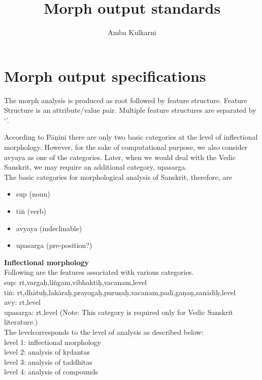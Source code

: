 \documentclass{llncs}
\begin{document}
\title{Morph output standards}
\author{Amba Kulkarni}
\date{}

\frenchspacing
\noindent
\maketitle

\section{Morph output specifications}
The morph analysis is produced as root followed by feature structure.
Feature Structure is an attribute/value pair. Multiple feature structures are separated by `\textbar'.

According to P{\=a}\d{n}ini there are only two basic categories at the level of inflectional morphology. However, for the sake of computational purpose, we also consider avyaya as one of the categories. Later, when we would deal with the Vedic Sanskrit, we may require an additional category, upasarga.\\

\noindent 
The basic categories for morphological analysis of Sanskrit, therefore, are 

\begin{itemize}
\item sup (noun)
\item ti\.{n} (verb)
\item avyaya (indeclinable)
\item upasarga (pre-position?)
\end{itemize}

\noindent 
\textbf {Inflectional morphology}\\
Following are the features associated with various categories.\\
sup:  rt,varga\d{h},li\.{n}gam,vibhakti\d{h},vacanam,level \\
ti\.{n}:  rt,dh{\=a}tu\d{h},lak{\=a}ra\d{h},prayoga\d{h},puru\d{s}a\d{h},vacanam,pad{\=\i},ga\d{n}a\d{n},san{\=a}di\d{h},level \\
avy:  rt,level \\
upasarga:  rt,level (Note: This category is required only for Vedic Sanskrit literature.)\\

The levelcorresponds to the level of analysis as described below:\\
level 1: inflectional morphology \\
level 2: analysis of k\d{r}dantas \\
level 3: analysis of taddhitas \\
level 4: analysis of compounds \\
\end{document}
